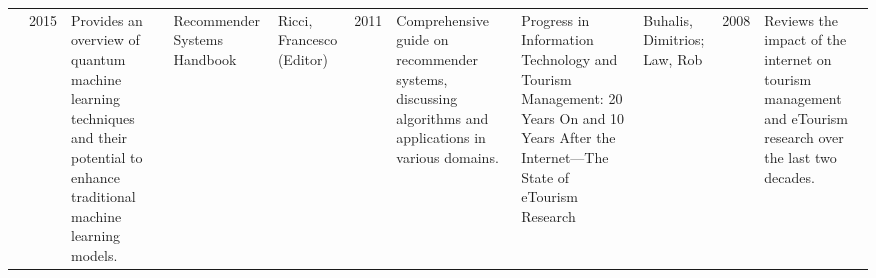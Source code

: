 \begin{longtable}{|p{0.5cm}|p{4cm}|p{4cm}|p{0.8cm}|p{5cm}|}
& 2015 & Provides an overview of quantum machine learning techniques and their potential to enhance traditional machine learning models. \  & Recommender Systems Handbook & Ricci, Francesco (Editor) & 2011 & Comprehensive guide on recommender systems, discussing algorithms and applications in various domains. \  & Progress in Information Technology and Tourism Management: 20 Years On and 10 Years After the Internet—The State of eTourism Research & Buhalis, Dimitrios; Law, Rob & 2008 & Reviews the impact of the internet on tourism management and eTourism research over the last two decades. \ \hline \end{longtable}